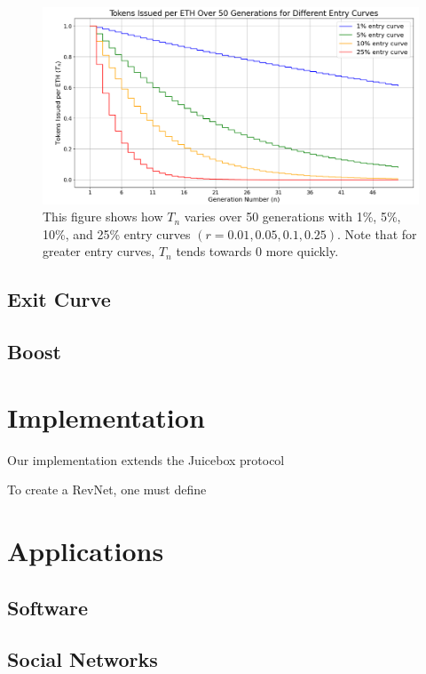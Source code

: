 \documentclass{article}
\begin{document}
\begin{figure}[h]
  \centering
  \includegraphics[width=\textwidth]{figures/multi-entry-curves.png}
  \caption{This figure shows how $T_n$ varies over 50 generations with 1\%, 5\%, 10\%, and 25\% entry curves $(r = 0.01, 0.05, 0.1, 0.25)$. Note that for greater entry curves, $T_n$ tends towards 0 more quickly.}
\end{figure}

\subsection{Exit Curve}

\subsection{Boost}

\section{Implementation}

Our implementation extends the Juicebox protocol

To create a RevNet, one must define

\section{Applications}

\subsection{Software}

\subsection{Social Networks}
\end{document}
